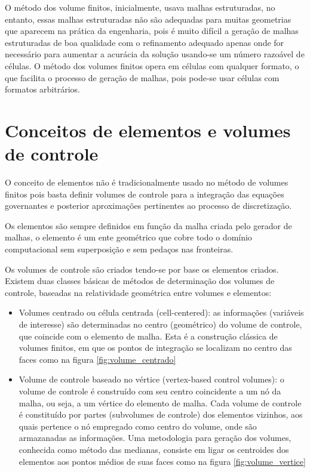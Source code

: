 O método dos volume finitos, inicialmente, usava malhas estruturadas, no entanto, essas malhas estruturadas não são adequadas para muitas geometrias que aparecem na prática da engenharia, pois é muito difícil a geração de malhas estruturadas de boa qualidade com o refinamento adequado apenas onde for necessário para aumentar a acurácia da solução usando-se um número razoável de células. O método dos volumes finitos opera em células com qualquer formato, o que facilita o processo de geração de malhas, pois pode-se usar células com formatos arbitrários. \cite{doi:10.1080/10407791003685155}

\section{Conceitos de elementos e volumes de controle}

O conceito de elementos não é tradicionalmente usado no método de volumes finitos pois basta definir volumes de controle para a integração das equações governantes e posterior aproximações pertinentes ao processo de discretização. \cite{Versteeg2007}

Os elementos são sempre definidos em função da malha criada pelo gerador de malhas, o elemento é um ente geométrico que cobre todo o domínio computacional sem superposição e sem pedaços nas fronteiras.

Os volumes de controle são criados tendo-se por base os elementos criados. Existem duas classes básicas de métodos de determinação dos volumes de controle, baseadas na relatividade geométrica entre volumes e elementos:

\begin{itemize}
    \item Volumes centrado ou célula centrada (cell-centered): as informações (variáveis de interesse) são determinadas no centro (geométrico) do volume de controle, que coincide com o elemento de malha. Esta é a construção clássica de volumes finitos, em que os pontos de integração se localizam no centro das faces como na figura \ref{fig:volume_centrado}
    \item Volume de controle baseado no vértice (vertex-based control volumes): o volume de controle é construído com seu centro coincidente a um nó da malha, ou seja, a um vértice do elemento de malha. Cada volume de controle é constituído por partes (subvolumes de controle) dos elementos vizinhos, aos quais pertence o nó empregado como centro do volume, onde são armazanadas as informações. Uma metodologia para geração dos volumes, conhecida como método das medianas, consiste em ligar os centroides dos elementos aos pontos médios de suas faces como na figura \ref{fig:volume_vertice}
\end{itemize}

